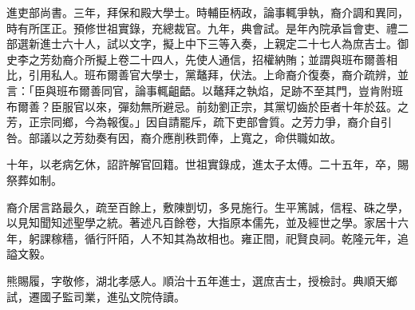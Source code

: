 \begin{pinyinscope}
進吏部尚書。三年，拜保和殿大學士。時輔臣柄政，論事輒爭執，裔介調和異同，時有所匡正。預修世祖實錄，充總裁官。九年，典會試。是年內院承旨會吏、禮二部選新進士六十人，試以文字，擬上中下三等入奏，上親定二十七人為庶吉士。御史李之芳劾裔介所擬上卷二十四人，先使人通信，招權納賄；並謂與班布爾善相比，引用私人。班布爾善官大學士，黨鼇拜，伏法。上命裔介復奏，裔介疏辨，並言：「臣與班布爾善同官，論事輒齟齬。以鼇拜之執焰，足跡不至其門，豈肯附班布爾善？臣服官以來，彈劾無所避忌。前劾劉正宗，其黨切齒於臣者十年於茲。之芳，正宗同鄉，今為報復。」因自請罷斥，疏下吏部會質。之芳力爭，裔介自引咎。部議以之芳劾奏有因，裔介應削秩罰俸，上寬之，命供職如故。

十年，以老病乞休，詔許解官回籍。世祖實錄成，進太子太傅。二十五年，卒，賜祭葬如制。

裔介居言路最久，疏至百餘上，敷陳剴切，多見施行。生平篤誠，信程、硃之學，以見知聞知述聖學之統。著述凡百餘卷，大指原本儒先，並及經世之學。家居十六年，躬課稼穡，循行阡陌，人不知其為故相也。雍正間，祀賢良祠。乾隆元年，追謚文毅。

熊賜履，字敬修，湖北孝感人。順治十五年進士，選庶吉士，授檢討。典順天鄉試，遷國子監司業，進弘文院侍讀。


\end{pinyinscope}
